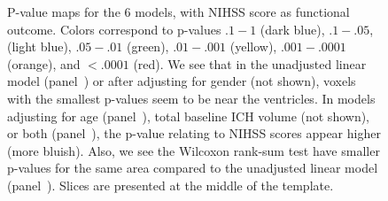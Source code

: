 \documentclass[10pt]{article}\usepackage[]{graphicx}\usepackage[]{color}
\begin{document}
\begin{figure}[H]
  \caption{P-value maps for the $6$ models, with NIHSS score as functional outcome. Colors correspond to p-values $.1-1$ (dark blue), $.1-.05$, (light blue), $.05-.01$ (green), $.01-.001$ (yellow),  $.001-.0001$ (orange), and $< .0001$ (red).  We see that in the unadjusted linear model (panel~\protect{}) or after adjusting for gender (not shown), voxels with the smallest p-values seem to be near the ventricles.  In models adjusting for age (panel~\protect{}), total baseline ICH volume (not shown), or both (panel~\protect{}), the p-value relating to NIHSS scores appear higher (more bluish).  Also, we see the Wilcoxon rank-sum test have smaller p-values for the same area compared to the unadjusted linear model (panel~\protect{}). Slices are presented at the middle of the template.  }
  \label{f:mods}
\end{figure}
\end{document}
